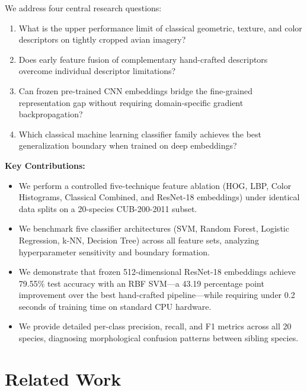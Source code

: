 \documentclass[conference]{IEEEtran}
\begin{document}
We address four central research questions:
\begin{enumerate}
    \item What is the upper performance limit of classical geometric, texture, and color descriptors on tightly cropped avian imagery?
    \item Does early feature fusion of complementary hand-crafted descriptors overcome individual descriptor limitations?
    \item Can frozen pre-trained CNN embeddings bridge the fine-grained representation gap without requiring domain-specific gradient backpropagation?
    \item Which classical machine learning classifier family achieves the best generalization boundary when trained on deep embeddings?
\end{enumerate}

\noindent\textbf{Key Contributions:}
\begin{itemize}
    \item We perform a controlled five-technique feature ablation (HOG, LBP, Color Histograms, Classical Combined, and ResNet-18 embeddings) under identical data splits on a 20-species CUB-200-2011 subset.
    \item We benchmark five classifier architectures (SVM, Random Forest, Logistic Regression, k-NN, Decision Tree) across all feature sets, analyzing hyperparameter sensitivity and boundary formation.
    \item We demonstrate that frozen 512-dimensional ResNet-18 embeddings achieve 79.55\% test accuracy with an RBF SVM---a 43.19 percentage point improvement over the best hand-crafted pipeline---while requiring under 0.2 seconds of training time on standard CPU hardware.
    \item We provide detailed per-class precision, recall, and F1 metrics across all 20 species, diagnosing morphological confusion patterns between sibling species.
\end{itemize}

\section{Related Work}
\label{sec:related}
\end{document}
